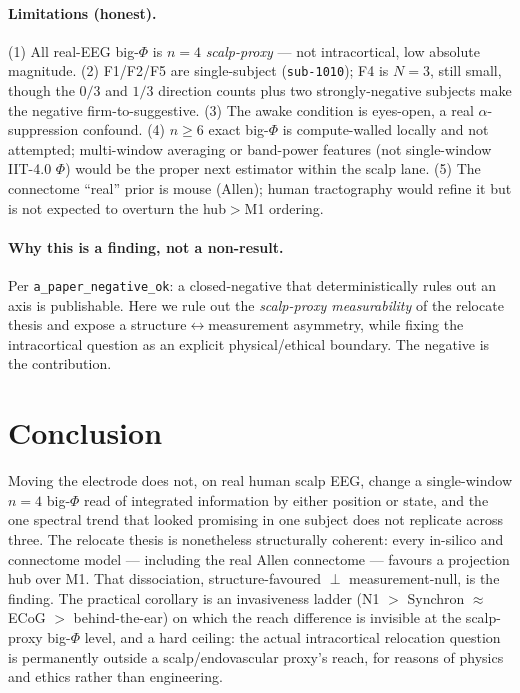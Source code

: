 \documentclass[11pt,a4paper]{article}
\begin{document}
\paragraph{Limitations (honest).}
(1) All real-EEG big-$\Phi$ is $n{=}4$ \emph{scalp-proxy} --- not intracortical,
low absolute magnitude. (2) F1/F2/F5 are single-subject (\texttt{sub-1010});
F4 is $N{=}3$, still small, though the $0/3$ and $1/3$ direction counts plus two
strongly-negative subjects make the negative firm-to-suggestive. (3) The awake
condition is eyes-open, a real $\alpha$-suppression confound. (4) $n{\ge}6$
exact big-$\Phi$ is compute-walled locally and not attempted; multi-window
averaging or band-power features (not single-window IIT-4.0 $\Phi$) would be
the proper next estimator within the scalp lane. (5) The connectome ``real''
prior is mouse (Allen); human tractography would refine it but is not expected
to overturn the hub$>$M1 ordering.

\paragraph{Why this is a finding, not a non-result.}
Per \texttt{a\_paper\_negative\_ok}: a closed-negative that deterministically
rules out an axis is publishable. Here we rule out the \emph{scalp-proxy
measurability} of the relocate thesis and expose a structure$\leftrightarrow$measurement
asymmetry, while fixing the intracortical question as an explicit physical/ethical
boundary. The negative is the contribution.

\section{Conclusion}\label{sec:conclusion}

Moving the electrode does not, on real human scalp EEG, change a single-window
$n{=}4$ big-$\Phi$ read of integrated information by either position or state,
and the one spectral trend that looked promising in one subject does not
replicate across three. The relocate thesis is nonetheless structurally
coherent: every in-silico and connectome model --- including the real Allen
connectome --- favours a projection hub over M1. That dissociation,
structure-favoured $\perp$ measurement-null, is the finding. The practical
corollary is an invasiveness ladder (N1 $>$ Synchron $\approx$ ECoG $>$
behind-the-ear) on which the reach difference is invisible at the scalp-proxy
big-$\Phi$ level, and a hard ceiling: the actual intracortical relocation
question is permanently outside a scalp/endovascular proxy's reach, for reasons
of physics and ethics rather than engineering.
\end{document}
